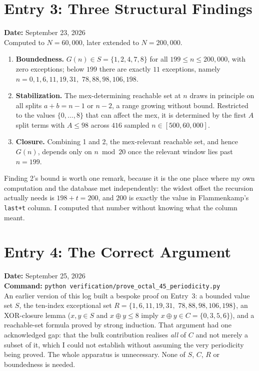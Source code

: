 \documentclass[12pt]{article}
\begin{document}
\section*{Entry 3: Three Structural Findings}
\textbf{Date:} September 23, 2026 \\
Computed to $N=60{,}000$, later extended to $N=200{,}000$.
\begin{enumerate}[label=\textbf{\arabic*.}]
\item \textbf{Boundedness.} $G(n)\in S=\{1,2,4,7,8\}$ for all
$199\le n\le 200{,}000$, with zero exceptions; below $199$ there are
exactly $11$ exceptions, namely
$n=0,1,6,11,19,31,$ $78,88,98,106,198$.
\item \textbf{Stabilization.} The mex-determining reachable set at $n$ draws
in principle on all splits $a+b=n-1$ or $n-2$, a range growing without bound.
Restricted to the values $\{0,\dots,8\}$ that can affect the mex, it is
determined by the first $A$ split terms with $A\le98$ across $416$ sampled
$n\in[500,60{,}000]$.
\item \textbf{Closure.} Combining 1 and 2, the mex-relevant reachable set, and
hence $G(n)$, depends only on $n\bmod 20$ once the relevant window lies past
$n=199$.
\end{enumerate}
Finding 2's bound is worth one remark, because it is the one place where my
own computation and the database met independently: the widest offset the
recursion actually needs is $198+t=200$, and $200$ is exactly the value in
Flammenkamp's \texttt{last+t} column. I computed that number without knowing
what the column meant.

\section*{Entry 4: The Correct Argument}
\textbf{Date:} September 25, 2026 \\
\textbf{Command:}
{\small\texttt{python verification/prove\_octal\_45\_periodicity.py}} \\
An earlier version of this log built a bespoke proof on Entry~3: a bounded
value set $S$, the ten-index exceptional set
$R=\{1,6,11,19,31,$ $78,88,98,106,198\}$, an XOR-closure lemma
($x,y\in S$ and $x\oplus y\le8$ imply $x\oplus y\in C=\{0,3,5,6\}$), and a
reachable-set formula proved by strong induction. That argument had one
acknowledged gap: that the bulk contribution realises \emph{all} of $C$
and not merely a subset of it, which I could not establish without
assuming the very periodicity being proved. The whole apparatus is
unnecessary. None of $S$, $C$, $R$ or boundedness is needed.
\end{document}
